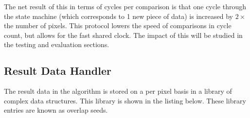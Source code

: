 The net result of this in terms of cycles per comparison is that one cycle through the state machine (which corresponds to 1 new piece of data) is increased by $2 \times $the number of pixels. This protocol lowers the speed of comparisons in cycle count, but allows for the fast shared clock. The impact of this will be studied in the testing and evaluation sections. 





\subsection{Result Data Handler}

The result data in the algorithm is stored on a per pixel basis in a library of complex data structures. This library is shown in the listing below. These library entries are known as overlap seeds.


